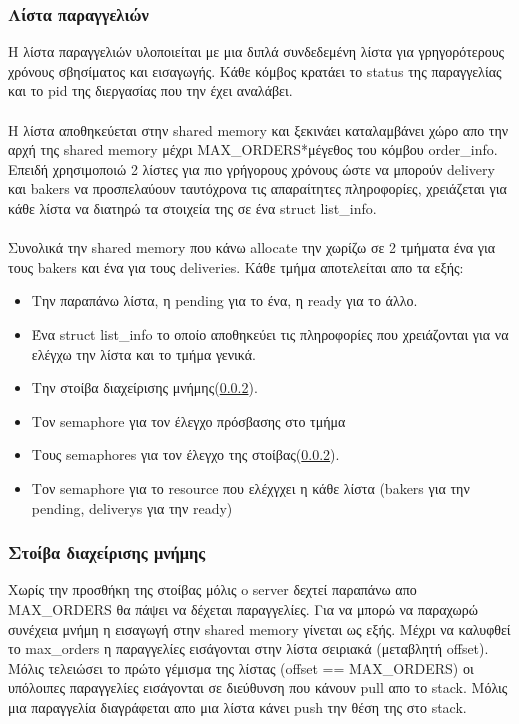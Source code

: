 \documentclass{article}
\begin{document}
\subsubsection{Λίστα παραγγελιών}
\label{list_info}
Η λίστα παραγγελιών υλοποιείται με μια διπλά συνδεδεμένη λίστα για γρηγορότερους χρόνους σβησίματος και εισαγωγής. Κάθε κόμβος κρατάει το status της παραγγελίας και το pid της διεργασίας που την έχει αναλάβει.
\paragraph{}
Η λίστα αποθηκεύεται στην shared memory και ξεκινάει καταλαμβάνει χώρο απο την αρχή της shared memory μέχρι MAX\_ORDERS*μέγεθος του κόμβου order\_info. Επειδή χρησιμοποιώ 2 λίστες για πιο γρήγορους χρόνους ώστε να μπορούν delivery και bakers να προσπελαύουν ταυτόχρονα τις απαραίτητες πληροφορίες, χρειάζεται για κάθε λίστα να διατηρώ τα στοιχεία της σε ένα struct list\_info.
\paragraph{}
Συνολικά την shared memory που κάνω allocate την χωρίζω σε 2 τμήματα ένα για τους bakers και ένα για τους deliveries. Κάθε τμήμα αποτελείται απο τα εξής:
\begin{itemize}
 \item Την παραπάνω λίστα, η pending για το ένα, η ready για το άλλο.
 \item Ένα struct list\_info το οποίο αποθηκεύει τις πληροφορίες που χρειάζονται για να ελέγχω την λίστα και το τμήμα γενικά.
 \item Την στοίβα διαχείρισης μνήμης(\ref{stack}).
 \item Τον semaphore για τον έλεγχο πρόσβασης στο τμήμα
 \item Τους semaphores για τον έλεγχο της στοίβας(\ref{stack}).
 \item Τον semaphore για το resource που ελέχγχει η κάθε λίστα (bakers για την pending, deliverys για την ready)
\end{itemize}

\subsubsection{Στοίβα διαχείρισης μνήμης}
\label{stack}
Χωρίς την προσθήκη της στοίβας μόλις o server δεχτεί παραπάνω απο MAX\_ORDERS θα πάψει να δέχεται παραγγελίες. Για να μπορώ να παραχωρώ συνέχεια μνήμη η εισαγωγή στην shared memory γίνεται ως εξής. Μέχρι να καλυφθεί το max\_orders η παραγγελίες εισάγονται στην λίστα σειριακά (μεταβλητή offset). Μόλις τελειώσει το πρώτο γέμισμα της λίστας (offset == MAX\_ORDERS) οι υπόλοιπες παραγγελίες εισάγονται σε διεύθυνση που κάνουν pull απο το stack. Μόλις μια παραγγελία διαγράφεται απο μια λίστα κάνει push την θέση της στο stack.
\end{document}
